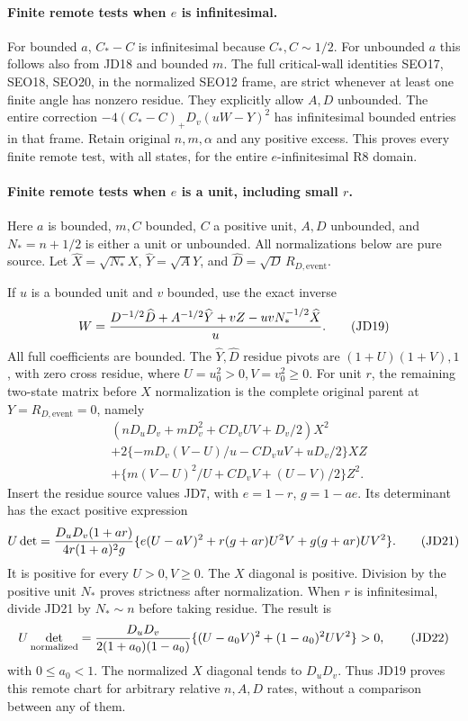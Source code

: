 \paragraph{Finite remote tests when $e$ is infinitesimal.}
For bounded $a$, $C_*-C$ is infinitesimal because $C_*,C\sim1/2$.
For unbounded $a$ this follows also from JD18 and bounded $m$.
The full critical-wall identities SEO17, SEO18, SEO20, in the
normalized SEO12 frame, are strict whenever at least one finite
angle has nonzero residue.  They explicitly allow $A,D$ unbounded.
The entire correction $-4(C_*-C)_+D_v(uW-Y)^2$ has infinitesimal
bounded entries in that frame.  Retain original $n,m,\alpha$ and
any positive excess.  This proves every finite remote test, with
all states, for the entire $e$-infinitesimal R8 domain.

\paragraph{Finite remote tests when $e$ is a unit, including small $r$.}
Here $a$ is bounded, $m,C$ bounded, $C$ a positive unit, $A,D$
unbounded, and $N_*=n+1/2$ is either a unit or unbounded.  All
normalizations below are pure source.  Let
$\widehat X=\sqrt{N_*}X$, $\widehat Y=\sqrt A Y$, and
$\widehat D=\sqrt D\,R_{D,\mathrm{event}}$.

If $u$ is a bounded unit and $v$ bounded, use the exact inverse
\[
 W={D^{-1/2}\widehat D+A^{-1/2}\widehat Y+vZ
                         -uvN_*^{-1/2}\widehat X\over u}.
                                                               \tag{JD19}
\]
All full coefficients are bounded.  The $\widehat Y,\widehat D$
residue pivots are $(1+U)(1+V),1$, with zero cross residue, where
$U=u_0^2>0,V=v_0^2\ge0$.  For unit $r$, the remaining two-state
matrix before $X$ normalization is the complete original parent at
$Y=R_{D,\mathrm{event}}=0$, namely
\[
 \begin{split}
 &(nD_uD_v+mD_v^2+CD_vUV+D_v/2)X^2\\
 &+2\{-mD_v(V-U)/u-CD_vuV+uD_v/2\}XZ\\
 &+\{m(V-U)^2/U+CD_vV+(U-V)/2\}Z^2.
 \end{split}                                                   \tag{JD20}
\]
Insert the residue source values JD7, with $e=1-r$, $g=1-ae$.
Its determinant has the exact positive expression
\[
 \begin{split}
 U\det={D_uD_v(1+ar)\over4r(1+a)^2g}
 \{e(U-aV)^2+r(g+ar)U^2V+g(g+ar)UV^2\}.             
 \end{split}\tag{JD21}
\]
It is positive for every $U>0,V\ge0$.  The $X$ diagonal is
positive.  Division by the positive unit $N_*$ proves strictness
after normalization.  When $r$ is infinitesimal, divide JD21 by
$N_*\sim n$ before taking residue.  The result is
\[
 U\det_{\rm normalized}
 ={D_uD_v\over2(1+a_0)(1-a_0)}
       \{(U-a_0V)^2+(1-a_0)^2UV^2\}>0,             \tag{JD22}
\]
with $0\le a_0<1$.  The normalized $X$ diagonal tends to $D_uD_v$.
Thus JD19 proves this remote chart for arbitrary relative $n,A,D$
rates, without a comparison between any of them.

